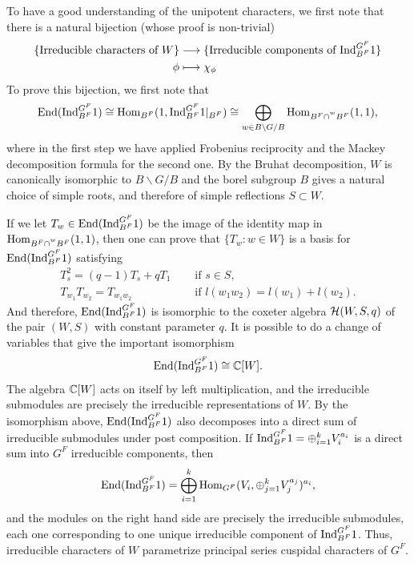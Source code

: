 To have a good understanding of the unipotent characters, we first note that there is a natural bijection (whose proof is non-trivial)
\begin{align*}
    \{\text{Irreducible characters of }W\}&\longrightarrow\{\text{Irreducible components of }\mathrm{Ind}_{B^F}^{G^F}1\}\\
    \phi&\longmapsto\chi_\phi
\end{align*}
To prove this bijection, we first note that
\begin{align*}
    \mathrm{End}(\mathrm{Ind}_{B^F}^{G^F}1)\cong \mathrm{Hom}_{B^F}(1,\mathrm{Ind}_{B^F}^{G^F}1|_{B^F})\cong\bigoplus_{w\in B\backslash G/B}\mathrm{Hom}_{B^F\cap \prescript{w}{}{B^F}}(1,1),
\end{align*}
where in the first step we have applied Frobenius reciprocity and the Mackey decomposition formula for the second one. By the Bruhat decomposition, $W$ is canonically isomorphic to $B\backslash G/B$ and the borel subgroup $B$ gives a natural choice of simple roots, and therefore of simple reflections $S\subset W$.

If we let $T_w\in\mathrm{End}(\mathrm{Ind}_{B^F}^{G^F}1)$ be the image of the identity map in $\mathrm{Hom}_{B^F\cap \prescript{w}{}{B^F}}(1,1)$, then one can prove that $\{T_w:w\in W\}$ is a basis for $\mathrm{End}(\mathrm{Ind}_{B^F}^{G^F}1)$ satisfying 
\begin{align*}
    T_s^2=(q-1)T_s+qT_1 & \quad\text{ if }s\in S,\\
    T_{w_1}T_{w_2}=T_{w_1w_2} & \quad\text{ if }l(w_1w_2)=l(w_1)+l(w_2).
\end{align*}
And therefore, $\mathrm{End}(\mathrm{Ind}_{B^F}^{G^F}1)$ is isomorphic to the coxeter algebra $\mathcal{H}(W,S,q)$ of the pair $(W,S)$ with constant parameter $q$. It is possible to do a change of variables that give the important isomorphism
$$\mathrm{End}(\mathrm{Ind}_{B^F}^{G^F}1)\cong\mathbb{C}[W].$$
The algebra $\mathbb{C}[W]$ acts on itself by left multiplication, and the irreducible submodules are precisely the irreducible representations of $W$. By the isomorphism above, $\mathrm{End}(\mathrm{Ind}_{B^F}^{G^F}1)$ also decomposes into a direct sum of irreducible submodules under post composition. If $\mathrm{Ind}_{B^F}^{G^F}1=\oplus_{i=1}^kV_i^{a_i}$ is a direct sum into $G^F$ irreducible components, then 
$$\mathrm{End}(\mathrm{Ind}_{B^F}^{G^F}1)=\bigoplus_{i=1}^k\mathrm{Hom}_{G^F}(V_i,\oplus_{j=1}^kV_j^{a_j})^{a_i},$$
and the modules on the right hand side are precisely the irreducible submodules, each one corresponding to one unique irreducible component of $\mathrm{Ind}_{B^F}^{G^F}1$. Thus, irreducible characters of $W$ parametrize principal series cuspidal characters of $G^F$.

